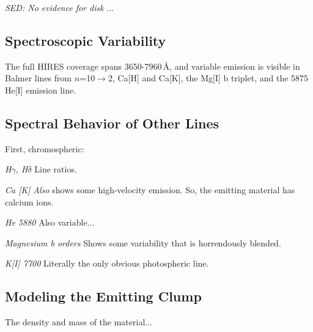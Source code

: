 \documentclass{nature3}
\begin{document}
\begin{methods}
{\it SED: No evidence for disk}
...



\subsection{Spectroscopic Variability}\phantom{+}

The full HIRES coverage spans 3650-7960\,\AA, and variable
  emission is visible in Balmer lines from $n$=10$\rightarrow$2, Ca[H]
  and Ca[K], the Mg[I] b triplet, and the 5875 He[I] emission line.




\subsection{Spectral Behavior of Other Lines}

First, chromospheric:

{\it H$\gamma$, H$\delta$}
Line ratios.

{\it Ca [K]}
{\it Also} shows some high-velocity emission.  So, the emitting material has
calcium ions.

{\it He 5880}
Also variable...

{\it Magnesium b orders}
Shows some variability that is horrendously blended.

{\it K[I] 7700}
Literally the only obvious photospheric line.



\subsection{Modeling the Emitting Clump}
\label{subsec:model}

The density and mass of the material...





\end{methods}
\end{document}
